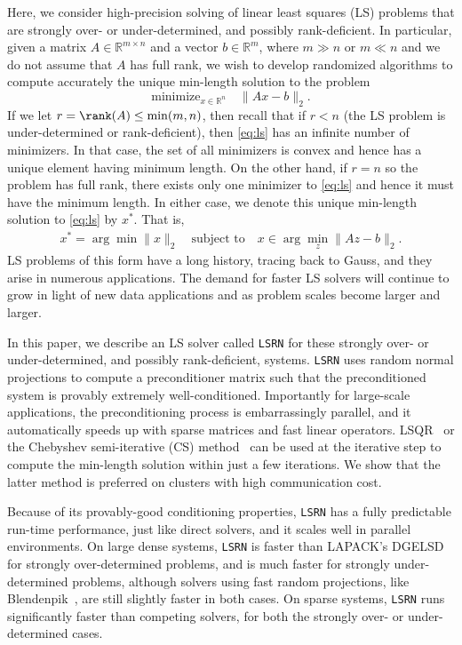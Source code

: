 \documentclass{siamltex}
\begin{document}
Here, we consider high-precision solving of linear least squares (LS) problems
that are strongly over- or under-determined, and possibly rank-deficient.  In
particular, given a matrix $A \in \mathbb{R}^{m \times n}$ and a vector $b \in
\mathbb{R}^m$, where $m \gg n$ or $m \ll n$ and we do not assume that $A$ has
full rank, we wish to develop randomized algorithms to compute accurately the
unique min-length solution to the problem
\begin{equation}
  \label{eq:ls}
  \text{minimize}_{x \in \mathbb{R}^n}  \quad \| A x - b \|_2  .
\end{equation}
If we let $r = \rank(A) \leq \min(m,n)$, then recall that if $r < n$ (the LS
problem is under-determined or rank-deficient), then \eqref{eq:ls} has an
infinite number of minimizers.  In that case, the set of all minimizers is
convex and hence has a unique element having minimum length.  On the other hand,
if $r = n$ so the problem has full rank, there exists only one minimizer
to \eqref{eq:ls} and hence it must have the minimum length.  In either case, we
denote this unique min-length solution to \eqref{eq:ls} by $x^*$.  That is,
\begin{eqnarray}
  \label{eq:ls_min_length}
  x^* = \arg \min \| x \|_2 \quad \text{subject to} \quad x \in \arg \min_z \| A z - b \|_2.
\end{eqnarray}
LS problems of this form have a long history, tracing back to Gauss, and they
arise in numerous applications.  The demand for faster LS solvers will continue
to grow in light of new data applications and as problem scales become larger
and larger.

In this paper, we describe an LS solver called \texttt{LSRN} for these strongly
over- or under-determined, and possibly rank-deficient, systems. \texttt{LSRN}
uses random normal projections to compute a preconditioner matrix such that the
preconditioned system is provably extremely well-conditioned.  Importantly for
large-scale applications, the preconditioning process is embarrassingly
parallel, and it automatically speeds up with sparse matrices and fast linear
operators.  LSQR~\cite{paige1982lsqr} or the Chebyshev semi-iterative (CS)
method~\cite{golub1961chebyshev} can be used at the iterative step to compute
the min-length solution within just a few iterations.  We show that the latter
method is preferred on clusters with high communication cost.

Because of its provably-good conditioning properties, \texttt{LSRN} has a fully
predictable run-time performance, just like direct solvers, and it scales well
in parallel environments. On large dense systems, \texttt{LSRN} is faster than
LAPACK's DGELSD for strongly over-determined problems, and is much faster for
strongly under-determined problems, although solvers using fast random
projections, like Blendenpik~\cite{avron2010blendenpik}, are still slightly
faster in both cases.  On sparse systems, \texttt{LSRN} runs significantly
faster than competing solvers, for both the strongly over- or under-determined
cases.
\end{document}
